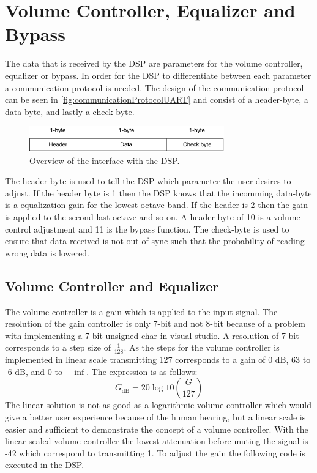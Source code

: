 \section{Volume Controller, Equalizer and Bypass}\label{sec:Bypass}

The data that is received by the DSP are parameters for the volume controller, equalizer or bypass. In order for the DSP to differentiate between each parameter a communication protocol is needed. The design of the communication protocol can be seen in \autoref{fig:communicationProtocolUART} and consist of a header-byte, a data-byte, and lastly a check-byte. 
\begin{figure}[H]
\centering
\includegraphics[width=0.75\textwidth]{figures/communicationProtocolUART.pdf}
\caption{Overview of the interface with the DSP.}
\label{fig:communicationProtocolUART}
\end{figure}
The header-byte is used to tell the DSP which parameter the user desires to adjust. If the header byte is 1 then the DSP knows that the incomming data-byte is a equalization gain for the lowest octave band. If the header is 2 then the gain is applied to the second last octave and so on. A header-byte of 10 is a volume control adjustment and 11 is the bypass function. The check-byte is used to ensure that data received is not out-of-sync such that the probability of reading wrong data is lowered.

\subsection*{Volume Controller and Equalizer}
The volume controller is a gain which is applied to the input signal. The resolution of the gain controller is only 7-bit and not 8-bit because of a problem with implementing a 7-bit unsigned char in visual studio. A resolution of 7-bit corresponds to a step size of $\frac{1}{128}$. As the steps for the volume controller is implemented in linear scale transmitting 127 corresponds to a gain of 0 dB, 63 to -6 dB, and 0 to $-\inf$. The expression is as follows:
\begin{equation}
G_{\text{dB}} = 20 \log 10 \left( \frac{G}{127} \right)
\end{equation}
The linear solution is not as good as a logarithmic volume controller which would give a better user experience because of the human hearing, but a linear scale is easier and sufficient to demonstrate the concept of a volume controller. With the linear scaled volume controller the lowest attenuation before muting the signal is -42 which correspond to transmitting 1. To adjust the gain the following code is executed in the DSP.

